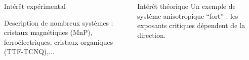 \documentclass[xcolor=dvipsnames]{beamer}
\begin{document}
\begin{frame}


\end{frame}

\begin{frame}

\begin{columns}

\begin{column}{5.5cm}
\begin{block}{Intérêt expérimental}

Description de nombreux systèmes : cristaux magnétiques (MnP), ferroélectriques, cristaux organiques (TTF-TCNQ),...

\end{block}
\end{column}

\begin{column}{5.5cm}
\begin{block}{Intérêt théorique}
Un exemple de système anisotropique ``fort'' : les exposants critiques dépendent de la direction.
\end{block}
\end{column}

\end{columns}

\end{frame}
\end{document}
